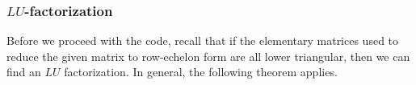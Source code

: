 \documentclass{ximera}
\begin{document}
    
    
    
    

    \subsubsection*{$LU$-factorization}
    
    Before we proceed with the code, recall that if the elementary matrices used to reduce the given matrix to row-echelon form are all lower triangular, then we can find an $LU$ factorization.  In general, the following theorem applies.
\end{document}
